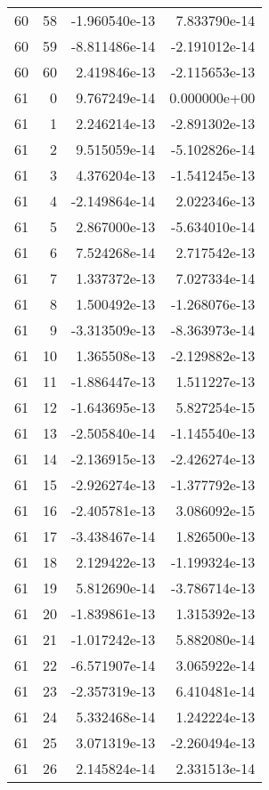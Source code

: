 \begin{tabular}{rrrr}
  60 &   58 & -1.960540e-13 &  7.833790e-14 \\
  60 &   59 & -8.811486e-14 & -2.191012e-14 \\
  60 &   60 &  2.419846e-13 & -2.115653e-13 \\
  61 &    0 &  9.767249e-14 &  0.000000e+00 \\
  61 &    1 &  2.246214e-13 & -2.891302e-13 \\
  61 &    2 &  9.515059e-14 & -5.102826e-14 \\
  61 &    3 &  4.376204e-13 & -1.541245e-13 \\
  61 &    4 & -2.149864e-14 &  2.022346e-13 \\
  61 &    5 &  2.867000e-13 & -5.634010e-14 \\
  61 &    6 &  7.524268e-14 &  2.717542e-13 \\
  61 &    7 &  1.337372e-13 &  7.027334e-14 \\
  61 &    8 &  1.500492e-13 & -1.268076e-13 \\
  61 &    9 & -3.313509e-13 & -8.363973e-14 \\
  61 &   10 &  1.365508e-13 & -2.129882e-13 \\
  61 &   11 & -1.886447e-13 &  1.511227e-13 \\
  61 &   12 & -1.643695e-13 &  5.827254e-15 \\
  61 &   13 & -2.505840e-14 & -1.145540e-13 \\
  61 &   14 & -2.136915e-13 & -2.426274e-13 \\
  61 &   15 & -2.926274e-13 & -1.377792e-13 \\
  61 &   16 & -2.405781e-13 &  3.086092e-15 \\
  61 &   17 & -3.438467e-14 &  1.826500e-13 \\
  61 &   18 &  2.129422e-13 & -1.199324e-13 \\
  61 &   19 &  5.812690e-14 & -3.786714e-13 \\
  61 &   20 & -1.839861e-13 &  1.315392e-13 \\
  61 &   21 & -1.017242e-13 &  5.882080e-14 \\
  61 &   22 & -6.571907e-14 &  3.065922e-14 \\
  61 &   23 & -2.357319e-13 &  6.410481e-14 \\
  61 &   24 &  5.332468e-14 &  1.242224e-13 \\
  61 &   25 &  3.071319e-13 & -2.260494e-13 \\
  61 &   26 &  2.145824e-14 &  2.331513e-14 \\

\end{tabular}

